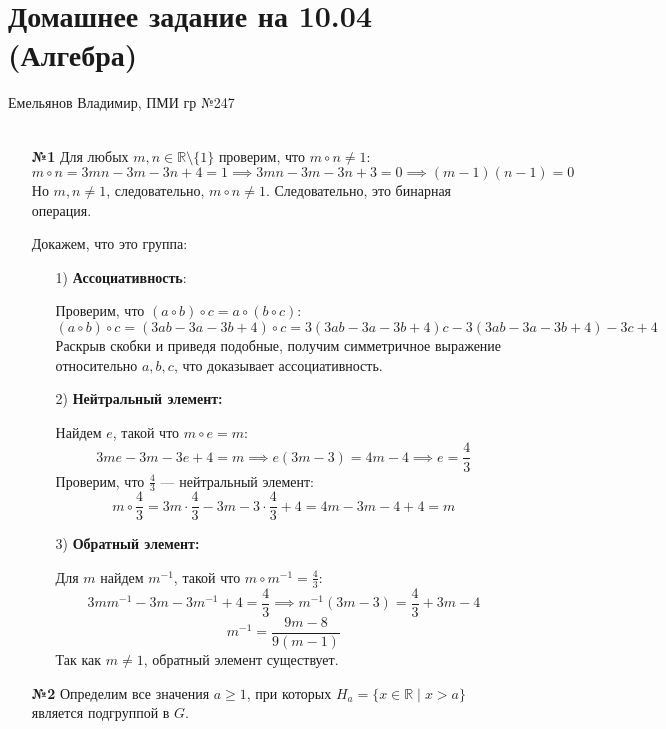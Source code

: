\documentclass[a4paper]{article}
\renewcommand{\geq}{\geqslant}
\begin{document}
\section*{Домашнее задание на 10.04 (Алгебра)}
 {\large Емельянов Владимир, ПМИ гр №247}\\\\
\begin{enumerate}
    \item[\textbf{№1}]Для любых \( m, n \in \mathbb{R} \setminus \{1\} \) проверим, что \( m \circ n \neq 1 \):
    \[
    m \circ n = 3mn - 3m - 3n + 4 = 1 \implies 3mn - 3m - 3n + 3 = 0 \implies (m - 1)(n - 1) = 0
    \]
    Но \( m, n \neq 1 \), следовательно, \( m \circ n \neq 1 \). Следовательно, это бинарная операция.
    
    Докажем, что это группа:
    \begin{enumerate}
        \item[1)]\textbf{Ассоциативность}:  
        
        Проверим, что \((a \circ b) \circ c = a \circ (b \circ c)\):
        \[
        (a \circ b) \circ c = (3ab - 3a - 3b + 4) \circ c = 3(3ab - 3a - 3b + 4)c - 3(3ab - 3a - 3b + 4) - 3c + 4
        \]
        Раскрыв скобки и приведя подобные, получим симметричное выражение относительно \( a, b, c \), что доказывает ассоциативность.
        

        \item[2)]\textbf{Нейтральный элемент:}
        
        Найдем \( e \), такой что \( m \circ e = m \):
        \[
        3me - 3m - 3e + 4 = m \implies e(3m - 3) = 4m - 4 \implies e = \frac{4}{3}
        \]
        Проверим, что \( \frac{4}{3} \) — нейтральный элемент:
        \[
        m \circ \frac{4}{3} = 3m \cdot \frac{4}{3} - 3m - 3 \cdot \frac{4}{3} + 4 = 4m - 3m - 4 + 4 = m
        \]
        \item[3)]\textbf{Обратный элемент:}
        
        Для \( m \) найдем \( m^{-1} \), такой что \( m \circ m^{-1} = \frac{4}{3} \):
        \[
        3m m^{-1} - 3m - 3m^{-1} + 4 = \frac{4}{3} \implies m^{-1}(3m - 3) = \frac{4}{3} + 3m - 4
        \]
        \[
        m^{-1} = \frac{9m - 8}{9(m - 1)}
        \]
        Так как \( m \neq 1 \), обратный элемент существует.
        
    \end{enumerate}

    \item[\textbf{№2}]Определим все значения \( a \geq 1 \), при которых \( H_a = \{x \in \mathbb{R} \mid x > a\} \) является подгруппой в \( G \).
    

\end{enumerate}
\end{document}
